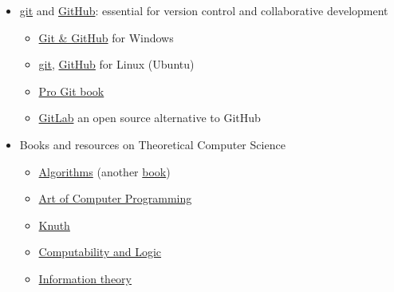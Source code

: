 \documentclass{article}
\begin{document}
\begin{itemize}
    \item \href{https://git-scm.com/}{git} and \href{https://github.com/}{GitHub}: essential for version control and collaborative development
    \begin{itemize}
        \item \href{https://www.youtube.com/watch?v=SWYqp7iY_Tc}{Git \& GitHub} for Windows
        \item \href{https://www.youtube.com/watch?v=USjZcfj8yxE}{git}, \href{https://www.youtube.com/watch?v=nhNq2kIvi9s}{GitHub} for Linux (Ubuntu)
        \item \href{https://git-scm.com/book/en/v2}{Pro Git book}
        \item \href{https://about.gitlab.com/}{GitLab} an open source alternative to GitHub
    \end{itemize}
    
    \item Books and resources on Theoretical Computer Science
    \begin{itemize}
    
        \item \href{https://www.goodreads.com/book/show/10803540-algorithms}{Algorithms} (another \href{https://www.goodreads.com/book/show/108986.Introduction_to_Algorithms}{book})

        \item \href{https://cs.stanford.edu/~knuth/taocp.html}{Art of Computer Programming}

        \item \href{https://cs.stanford.edu/~knuth/}{Knuth}
        
        \item \href{https://www.goodreads.com/book/show/1556746.Computability_and_Logic}{Computability and Logic}
        
        \item \href{https://www.goodreads.com/book/show/433439.Elements_of_Information_Theory}{Information theory}
    

\end{itemize}
\end{itemize}
\end{document}
